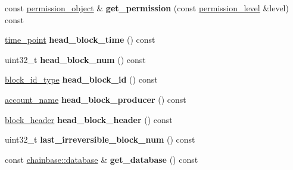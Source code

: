 \begin{DoxyCompactItemize}
const \mbox{\hyperlink{classaacio_1_1chain_1_1permission__object}{permission\+\_\+object}} \& {\bfseries get\+\_\+permission} (const \mbox{\hyperlink{structaacio_1_1chain_1_1permission__level}{permission\+\_\+level}} \&level) const
\item 
\mbox{\label{classaacio_1_1chain_1_1chain__controller_a9495638e0f5954a0978d76c388107eb2}} 
\mbox{\hyperlink{classfc_1_1time__point}{time\+\_\+point}} {\bfseries head\+\_\+block\+\_\+time} () const
\item 
\mbox{\label{classaacio_1_1chain_1_1chain__controller_afc52b1a79e60b9e7e4caee136a3698e0}} 
uint32\+\_\+t {\bfseries head\+\_\+block\+\_\+num} () const
\item 
\mbox{\label{classaacio_1_1chain_1_1chain__controller_a2905e573b12530954e83f5ace955bc62}} 
\mbox{\hyperlink{classfc_1_1sha256}{block\+\_\+id\+\_\+type}} {\bfseries head\+\_\+block\+\_\+id} () const
\item 
\mbox{\label{classaacio_1_1chain_1_1chain__controller_a65743c3f2579cc59a9c8c3f6530d461b}} 
\mbox{\hyperlink{structaacio_1_1chain_1_1name}{account\+\_\+name}} {\bfseries head\+\_\+block\+\_\+producer} () const
\item 
\mbox{\label{classaacio_1_1chain_1_1chain__controller_a70191cd2c7cc679541e442b1cc61a839}} 
\mbox{\hyperlink{structaacio_1_1chain_1_1block__header}{block\+\_\+header}} {\bfseries head\+\_\+block\+\_\+header} () const
\item 
\mbox{\label{classaacio_1_1chain_1_1chain__controller_a8d022bda03a5515365b1f976c90f962a}} 
uint32\+\_\+t {\bfseries last\+\_\+irreversible\+\_\+block\+\_\+num} () const
\item 
\mbox{\label{classaacio_1_1chain_1_1chain__controller_af72cd9f3b12c129383f3addae25f28f1}} 
const \mbox{\hyperlink{classchainbase_1_1database}{chainbase\+::database}} \& {\bfseries get\+\_\+database} () const
\item 
\mbox{\label{classaacio_1_1chain_1_1chain__controller_add3a6f50ecc7a3e2389d7eae513b52c0}} 

\end{DoxyCompactItemize}
